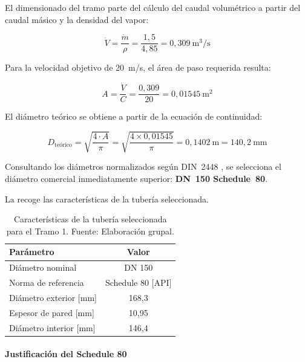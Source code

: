 \documentclass[12pt]{article}
\begin{document}
El dimensionado del tramo parte del cálculo del caudal volumétrico a partir del caudal másico y la densidad del vapor:

\begin{equation}
	\dot{V} = \frac{\dot{m}}{\rho} = \frac{1{,}5}{4{,}85} = 0{,}309 \ \text{m}^3\text{/s}
	\label{eq:caudal-volumetrico-tramo1}
\end{equation}

Para la velocidad objetivo de 20~m/s, el área de paso requerida resulta:

\begin{equation}
	A = \frac{\dot{V}}{C} = \frac{0{,}309}{20} = 0{,}01545 \ \text{m}^2
	\label{eq:area-paso-tramo1}
\end{equation}

El diámetro teórico se obtiene a partir de la ecuación de continuidad:

\begin{equation}
	D_{\text{teórico}} = \sqrt{\frac{4 \cdot A}{\pi}} = \sqrt{\frac{4 \times 0{,}01545}{\pi}} = 0{,}1402 \ \text{m} = 140{,}2 \ \text{mm}
	\label{eq:diametro-teorico-tramo1}
\end{equation}

Consultando los diámetros normalizados según DIN~2448 \cite{DIN2448}, se selecciona el diámetro comercial inmediatamente superior: \textbf{DN~150 Schedule~80}.

La  recoge las características de la tubería seleccionada.

\begin{table}[H]
	\centering
	\caption{Características de la tubería seleccionada para el Tramo 1. Fuente: Elaboración grupal.}
	\label{tab:seleccion-tuberia-tramo1}
	\begin{tabular}{lc}
		\toprule
		\textbf{Parámetro}     & \textbf{Valor}    \\
		\midrule
		Diámetro nominal       & DN 150            \\
		Norma de referencia    & Schedule 80 [API] \\
		Diámetro exterior [mm] & 168,3             \\
		Espesor de pared [mm]  & 10,95             \\
		Diámetro interior [mm] & 146,4             \\
		\bottomrule
	\end{tabular}
\end{table}

\paragraph{Justificación del Schedule 80}
\end{document}
